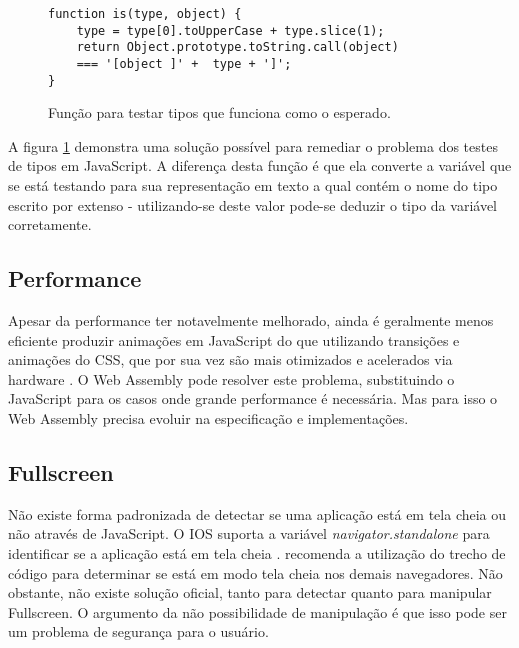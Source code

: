 \begin{figure}[H]
\centering
\begin{verbatim}
function is(type, object) {
    type = type[0].toUpperCase + type.slice(1);
    return Object.prototype.toString.call(object)
    === '[object ]' +  type + ']';
}
\end{verbatim}
\caption{Função para testar tipos que funciona como o esperado.}
\label{fig:fixJSTypes}
\end{figure}

A figura \ref{fig:fixJSTypes} demonstra uma solução possível para
remediar o problema dos testes de tipos em JavaScript. A diferença
desta função é que ela converte a variável que se está testando
para sua representação em texto a qual contém o nome do tipo escrito
por extenso - utilizando-se deste valor pode-se deduzir o tipo da
variável corretamente.

\subsection{Performance}

Apesar da performance ter notavelmente melhorado, ainda é geralmente
menos eficiente produzir animações em JavaScript do que utilizando
transições e animações do CSS, que por sua vez são mais
otimizados e acelerados via hardware \autocite{html5mostwanted}
. O Web Assembly pode resolver este problema,
substituindo o JavaScript para os casos onde grande performance
é necessária. Mas para isso o Web Assembly precisa evoluir na
especificação e implementações.

\subsection{Fullscreen}

Não existe forma padronizada de detectar se uma aplicação está
em tela cheia ou não através de JavaScript. O IOS suporta a
variável \textit{navigator.standalone } para identificar se a
aplicação está em tela cheia .
\citet{homescreenwebapps} recomenda a utilização do trecho de código
para determinar se está em modo tela cheia nos demais navegadores. Não
obstante, não existe solução oficial, tanto para detectar quanto para
manipular Fullscreen. O argumento da não possibilidade de manipulação
é que isso pode ser um problema de segurança para o usuário.

